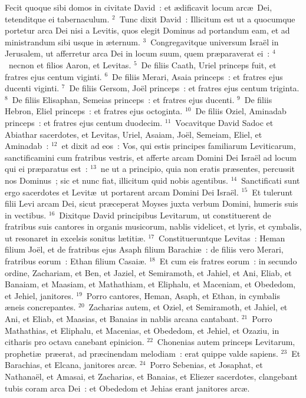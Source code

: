 \lettrine[lines=3,image=true,loversize=0.05,lraise=-0.03]{F}{}ecit quoque sibi domos in civitate David~: et \ae dificavit locum arc\ae\ Dei, tetenditque ei tabernaculum.
${}^{2}$~Tunc dixit David~: Illicitum est ut a quocumque portetur arca Dei nisi a Levitis, quos elegit Dominus ad portandum eam, et ad ministrandum sibi usque in \ae ternum.
${}^{3}$~Congregavitque universum Isra\"el in Jerusalem, ut afferretur arca Dei in locum suum, quem pr\ae paraverat ei~:
${}^{4}$~necnon et filios Aaron, et Levitas.
${}^{5}$~De filiis Caath, Uriel princeps fuit, et fratres ejus centum viginti.
${}^{6}$~De filiis Merari, Asaia princeps~: et fratres ejus ducenti viginti.
${}^{7}$~De filiis Gersom, Jo\"el princeps~: et fratres ejus centum triginta.
${}^{8}$~De filiis Elisaphan, Semeias princeps~: et fratres ejus ducenti.
${}^{9}$~De filiis Hebron, Eliel princeps~: et fratres ejus octoginta.
${}^{10}$~De filiis Oziel, Aminadab princeps~: et fratres ejus centum duodecim.
${}^{11}$~Vocavitque David Sadoc et Abiathar sacerdotes, et Levitas, Uriel, Asaiam, Jo\"el, Semeiam, Eliel, et Aminadab~:
${}^{12}$~et dixit ad eos~: Vos, qui estis principes familiarum Leviticarum, sanctificamini cum fratribus vestris, et afferte arcam Domini Dei Isra\"el ad locum qui ei pr\ae paratus est~:
${}^{13}$~ne ut a principio, quia non eratis pr\ae sentes, percussit nos Dominus~; sic et nunc fiat, illicitum quid nobis agentibus.
${}^{14}$~Sanctificati sunt ergo sacerdotes et Levit\ae\ ut portarent arcam Domini Dei Isra\"el.
${}^{15}$~Et tulerunt filii Levi arcam Dei, sicut pr\ae ceperat Moyses juxta verbum Domini, humeris suis in vectibus.
${}^{16}$~Dixitque David principibus Levitarum, ut constituerent de fratribus suis cantores in organis musicorum, nablis videlicet, et lyris, et cymbalis, ut resonaret in excelsis sonitus l\ae titi\ae .
${}^{17}$~Constitueruntque Levitas~: Heman filium Jo\"el, et de fratribus ejus Asaph filium Barachi\ae~: de filiis vero Merari, fratribus eorum~: Ethan filium Casai\ae .
${}^{18}$~Et cum eis fratres eorum~: in secundo ordine, Zachariam, et Ben, et Jaziel, et Semiramoth, et Jahiel, et Ani, Eliab, et Banaiam, et Maasiam, et Mathathiam, et Eliphalu, et Maceniam, et Obededom, et Jehiel, janitores.
${}^{19}$~Porro cantores, Heman, Asaph, et Ethan, in cymbalis \ae neis concrepantes.
${}^{20}$~Zacharias autem, et Oziel, et Semiramoth, et Jahiel, et Ani, et Eliab, et Maasias, et Banaias in nablis arcana cantabant.
${}^{21}$~Porro Mathathias, et Eliphalu, et Macenias, et Obededom, et Jehiel, et Ozaziu, in citharis pro octava canebant epinicion.
${}^{22}$~Chonenias autem princeps Levitarum, propheti\ae\ pr\ae erat, ad pr\ae cinendam melodiam~: erat quippe valde sapiens.
${}^{23}$~Et Barachias, et Elcana, janitores arc\ae .
${}^{24}$~Porro Sebenias, et Josaphat, et Nathana\"el, et Amasai, et Zacharias, et Banaias, et Eliezer sacerdotes, clangebant tubis coram arca Dei~: et Obededom et Jehias erant janitores arc\ae .


